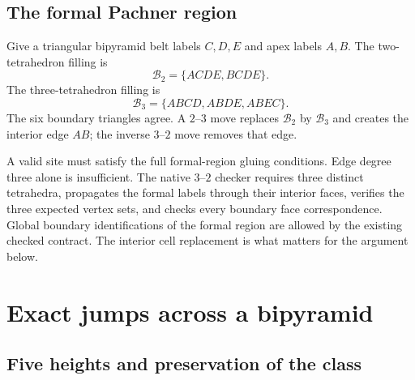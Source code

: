 \documentclass[11pt,letterpaper]{article}
\theoremstyle{definition}
\theoremstyle{remark}
\begin{document}
\subsection{The formal Pachner region}

Give a triangular bipyramid belt labels $C,D,E$ and apex labels $A,B$.
The two-tetrahedron filling is
\[
 \mathcal B_2=\{ACDE,BCDE\}.
\]
The three-tetrahedron filling is
\[
 \mathcal B_3=\{ABCD,ABDE,ABEC\}.
\]
The six boundary triangles agree. A $2$--$3$ move replaces
$\mathcal B_2$ by $\mathcal B_3$ and creates the interior edge $AB$;
the inverse $3$--$2$ move removes that edge.

A valid site must satisfy the full formal-region gluing conditions. Edge
degree three alone is insufficient. The native $3$--$2$ checker requires
three distinct tetrahedra, propagates the formal labels through their
interior faces, verifies the three expected vertex sets, and checks every
boundary face correspondence. Global boundary identifications of the formal
region are allowed by the existing checked contract. The interior cell
replacement is what matters for the argument below.

\section{Exact jumps across a bipyramid}
\label{sec:jumps}

\subsection{Five heights and preservation of the class}
\end{document}
